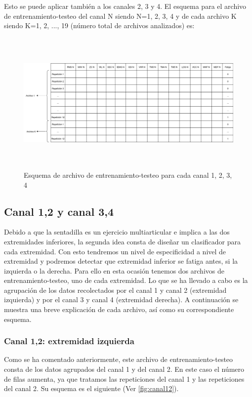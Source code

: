 Esto se puede aplicar también a los canales 2, 3 y 4. El esquema para el archivo de entrenamiento-testeo del canal N siendo N={1, 2, 3, 4} y de cada archivo K siendo K={1, 2, ..., 19} (número total de archivos analizados) es:

\begin{figure}[ht]

\includegraphics[width=1.0\textwidth,height=7cm]{imagenes/canal1234.png}
\caption{ Esquema de archivo de entrenamiento-testeo para cada canal 1, 2, 3, 4}
\label{fig:canal1234}
\end{figure}


\newpage
    \subsection{Canal 1,2 y canal 3,4}
Debido a que la sentadilla es un ejercicio multiarticular e implica a las dos extremidades inferiores, la segunda idea consta de diseñar un clasificador para cada extremidad. Con esto tendremos un nivel de especificidad a nivel de extremidad y podremos detectar que extremidad inferior se fatiga antes, si la izquierda o la derecha. Para ello en esta ocasión tenemos dos archivos de entrenamiento-testeo, uno de cada extremidad. Lo que se ha llevado a cabo es la agrupación de los datos recolectados por el canal 1 y canal 2 (extremidad izquierda) y por el canal 3 y canal 4 (extremidad derecha). A continuación se muestra una breve explicación de cada archivo, así como su correspondiente esquema.

        \subsubsection{Canal 1,2: extremidad izquierda}
        Como se ha comentado anteriormente, este archivo de entrenamiento-testeo consta de los datos agrupados del canal 1 y del canal 2. En este caso el número de filas aumenta, ya que tratamos las repeticiones del canal 1 y las repeticiones del canal 2. Su esquema es el siguiente (Ver \ref{fig:canal12}).
        

